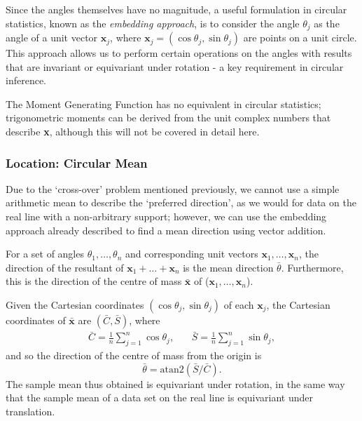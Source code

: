 \documentclass[../../ArchStats.tex]{subfiles}
\begin{document}
Since the angles themselves have no magnitude, a useful formulation in circular statistics, known as the \textit{embedding approach}, is to consider the angle $\theta_j$ as the angle of a unit vector $\mathbf{x}_j$, where $\mathbf{x}_j = (\cos\theta_j, \sin\theta_j)$ are points on a unit circle. This approach allows us to perform certain operations on the angles with results that are invariant or equivariant under rotation - a key requirement in circular inference.

The Moment Generating Function has no equivalent in circular statistics; trigonometric moments can be derived from the unit complex numbers that describe \textbf{x}, although this will not be covered in detail here.

\subsubsection{Location: Circular Mean}
\label{sec:circ-mean}

Due to the `cross-over' problem mentioned previously, we cannot use a simple arithmetic mean to describe the `preferred direction', as we would for data on the real line with a non-arbitrary support; however, we can use the embedding approach already described to find a mean direction using vector addition.

For a set of angles $\theta_1, \dots, \theta_n$ and corresponding unit vectors $\mathbf{x}_1, \dots, \mathbf{x}_n$, the direction of the resultant of $\mathbf{x}_1 + \dots + \mathbf{x}_n$ is the mean direction $\bar{\theta}$. Furthermore, this is the direction of the centre of mass $\mathbf{\bar{x}}$ of ($\mathbf{x}_1, \dots, \mathbf{x}_n$).

Given the Cartesian coordinates $(\cos\theta_j, \sin\theta_j)$ of each $\mathbf{x}_j$, the Cartesian coordinates of $\mathbf{\bar{x}}$ are $(\bar{C}, \bar{S})$, where
	\begin{equation}
	\label{eqn:C-and-S}
	\begin{matrix*}
	\displaystyle{\bar{C} = \frac{1}{n} \sum_{j=1}^{n} \cos \theta_j}, & \, & 
	\displaystyle{\bar{S} = \frac{1}{n} \sum_{j=1}^{n} \sin \theta_j},
	\end{matrix*}
	\end{equation}
and so the direction of the centre of mass from the origin is 
	\begin{equation}
	\label{eqn:circ-mean}
	\bar{\theta} = \text{atan2}(\bar{S}/\bar{C}).
	\end{equation}
The sample mean thus obtained is equivariant under rotation, in the same way that the sample mean of a data set on the real line is equivariant under translation.
\end{document}
